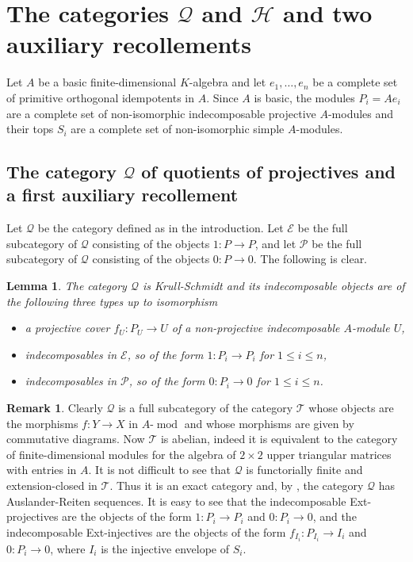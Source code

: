 \documentclass[11pt,a4paper]{amsart}
\theoremstyle{plain}
\newtheorem{lem}[thm]{Lemma}
\theoremstyle{definition}
\newtheorem{rem}[thm]{Remark}
\begin{document}
\section{The categories ${\mathcal{Q}}$ and ${\mathcal{H}}$ and two auxiliary recollements}
\label{s:qhdef}

Let $A$ be a basic finite-dimensional $K$-algebra and
let $e_1,\dots,e_n$ be a complete set of primitive orthogonal idempotents in $A$.
Since $A$ is basic, the modules $P_i = Ae_i$ are a complete set of non-isomorphic indecomposable
projective $A$-modules and their tops $S_i$ are a complete set of non-isomorphic simple $A$-modules.

\subsection*{The category ${\mathcal{Q}}$ of quotients of projectives and a first auxiliary recollement}

Let ${\mathcal{Q}}$ be the category defined as in the introduction.
Let $\mathcal{E}$ be the full subcategory of ${\mathcal{Q}}$ consisting of the objects $1\colon P\to P$,
and let $\mathcal{P}$ be the full subcategory of ${\mathcal{Q}}$ consisting of the objects $0\colon P\to 0$.
The following is clear.

\begin{lem}\label{initial}
The category ${\mathcal{Q}}$ is Krull-Schmidt and its indecomposable objects are of the following three types up to isomorphism
\begin{itemize}
\item[(1)] a projective cover $f_U\colon P_U \to U$ of a non-projective indecomposable $A$-module $U$,
\item[(2)] indecomposables in ${\mathcal{E}}$, so of the form $1\colon P_i\to P_i$ for $1\leq i\leq n$, 
\item[(3)] indecomposables in ${\mathcal{P}}$, so of the form $0\colon P_i \to 0$ for $1\leq i\leq n$. 
\end{itemize}
\end{lem}

\begin{rem}
Clearly ${\mathcal{Q}}$ is a full subcategory of the category ${\mathcal{T}}$ whose 
objects are the morphisms $f\colon Y\to X$ in $A$-$\operatorname{mod}$
and whose morphisms are given by commutative diagrams.
Now ${\mathcal{T}}$ is abelian, indeed it is equivalent to the category of finite-dimensional modules for
the algebra of $2\times 2$ upper triangular matrices with entries in $A$.
It is not difficult to see that ${\mathcal{Q}}$ is
functorially finite and extension-closed  in ${\mathcal{T}}$. Thus it is an exact category and,
by \cite[Theorem 2.4]{AS}, 
the category ${\mathcal{Q}}$ has Auslander-Reiten sequences.
It is easy to see that 
the indecomposable Ext-projectives are the objects of the form $1\colon P_i\to P_i$ and $0\colon P_i\to 0$,
and the indecomposable Ext-injectives are the objects of the form $f_{I_i}\colon P_{I_i}\to I_i$ and $0\colon P_i\to 0$, where $I_i$ is the injective envelope of $S_i$. 
\end{rem}
\end{document}
